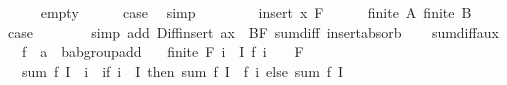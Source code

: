 \begin{isabellebody}
\ \ \ \ \isamarkupfalse%
\ empty\isanewline
\ \ \ \ \isamarkupfalse%
\ {\isacharquery}{\kern0pt}case\ \isamarkupfalse%
\ simp\isanewline
\ \ \isamarkupfalse%
\isanewline
\ \ \ \ \isamarkupfalse%
\ {\isacharparenleft}{\kern0pt}insert\ x\ F{\isacharparenright}{\kern0pt}\isanewline
\ \ \ \ \isamarkupfalse%
\ {\isacartoucheopen}finite\ A{\isacartoucheclose}\ {\isacartoucheopen}finite\ B{\isacartoucheclose}\ \isamarkupfalse%
\ {\isacharquery}{\kern0pt}case\isanewline
\ \ \ \ \ \ \isamarkupfalse%
\ {\isacharparenleft}{\kern0pt}simp\ add{\isacharcolon}{\kern0pt}\ Diff{\isacharunderscore}{\kern0pt}insert{\isacharbrackleft}{\kern0pt}\ a{\isacharequal}{\kern0pt}x\ \ B{\isacharequal}{\kern0pt}F{\isacharbrackright}{\kern0pt}\ sum{\isacharunderscore}{\kern0pt}diff{}\ insert{\isacharunderscore}{\kern0pt}absorb{\isacharparenright}{\kern0pt}\isanewline
\ \ \isamarkupfalse%
\isanewline
{}\isamarkupfalse%
%
\endisatagproof
{\isafoldproof}%
%
\isadelimproof
\isanewline
%
\endisadelimproof
\isanewline
{}\isamarkupfalse%
\ sum{\isacharunderscore}{\kern0pt}diff{}{\isacharprime}{\kern0pt}{\isacharunderscore}{\kern0pt}aux{\isacharcolon}{\kern0pt}\isanewline
\ \ \ f\ {\isacharcolon}{\kern0pt}{\isacharcolon}{\kern0pt}\ {\isachardoublequoteopen}{\isacharprime}{\kern0pt}a\ {\isasymRightarrow}\ {\isacharprime}{\kern0pt}b{\isacharcolon}{\kern0pt}{\isacharcolon}{\kern0pt}ab{\isacharunderscore}{\kern0pt}group{\isacharunderscore}{\kern0pt}add{\isachardoublequoteclose}\isanewline
\ \ \ {\isachardoublequoteopen}finite\ F{\isachardoublequoteclose}\ {\isachardoublequoteopen}{\isacharbraceleft}{\kern0pt}i\ {\isasymin}\ I{\isachardot}{\kern0pt}\ f\ i\ {\isasymnoteq}\ {}{\isacharbraceright}{\kern0pt}\ {\isasymsubseteq}\ F{\isachardoublequoteclose}\isanewline
\ \ \ {\isachardoublequoteopen}sum{\isacharprime}{\kern0pt}\ f\ {\isacharparenleft}{\kern0pt}I\ {\isacharminus}{\kern0pt}\ {\isacharbraceleft}{\kern0pt}i{\isacharbraceright}{\kern0pt}{\isacharparenright}{\kern0pt}\ {\isacharequal}{\kern0pt}\ {\isacharparenleft}{\kern0pt}if\ i\ {\isasymin}\ I\ then\ sum{\isacharprime}{\kern0pt}\ f\ I\ {\isacharminus}{\kern0pt}\ f\ i\ else\ sum{\isacharprime}{\kern0pt}\ f\ I{\isacharparenright}{\kern0pt}{\isachardoublequoteclose}\isanewline
%
\isadelimproof
\ \ %
\endisadelimproof
%
\isatagproof
{}\isamarkupfalse%

\end{isabellebody}
